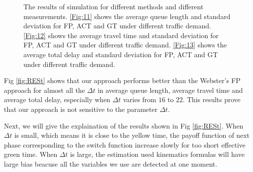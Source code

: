 \documentclass[a4paper, 10pt, conference]{ieeeconf}      %
\begin{document}
\begin{figure}[thbp]
        \centering
        \hfill
        \hfill
        \par
        \caption{The results of simulation for different methods and different measurements. 
        \ref{Fig:11} shows the average queue length and standard deviation for FP, ACT and GT under different traffic demand.
        \ref{Fig:12} shows the average travel time and standard deviation for FP, ACT and GT under different traffic demand.
        \ref{Fig:13} shows the average total delay and standard deviation for FP, ACT and GT under different traffic demand.}
        \label{fig:RES}
\end{figure}


Fig \ref{fig:RESt} shows that our approach performs better than the Webster's FP approach for almost all the $\Delta t$ in 
average queue length, average travel time and average total delay, especially when $\Delta t$ varies from $16$ to $22$. This results 
prove that our approach is not sensitive to the parameter $\Delta t$. 

Next, we will give the explaination of the results shown in Fig \ref{fig:RESt}. When $\Delta t$ is small, which means it is close to the 
yellow time, the payoff function of next phase corresponding to the switch function increase slowly for too short effective green time. 
When $\Delta t$ is large, the estimation used kinematics formulas will have large bias beacuse all the variables we use are detected at 
one moment. 
\end{document}
